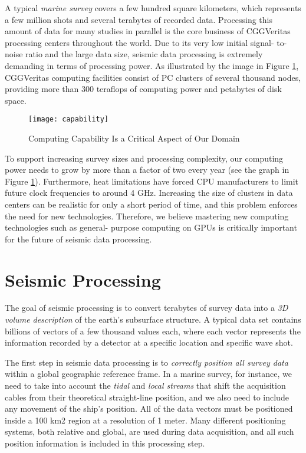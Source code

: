\documentclass[twocolumn]{article}
\begin{document}
A typical \emph{marine survey} covers a few hundred square kilometers, which represents a few million shots and several terabytes of recorded data. Processing this amount of data for many studies in parallel is the core business of CGGVeritas processing centers throughout the world. Due to its very low initial signal- to-noise ratio and the large data size, seismic data processing is extremely demanding in terms of processing power. As illustrated by the image in Figure \ref{capability}, CGGVeritas computing facilities consist of PC clusters of several thousand nodes, providing more than 300 teraflops of computing power and petabytes of disk space.

\begin{figure}[htb]
        \centering
        \texttt{[image: capability]}
        \caption{Computing Capability Is a Critical Aspect of Our Domain}
        \label{capability}
\end{figure}

To support increasing survey sizes and processing complexity, our computing power needs to grow by more than a factor of two every year (see the graph in Figure \ref{capability}). Furthermore, heat limitations have forced CPU manufacturers to limit future clock frequencies to around 4 GHz. Increasing the size of clusters in data centers can be realistic for only a short period of time, and this problem enforces the need for new technologies. Therefore, we believe mastering new computing technologies such as general- purpose computing on GPUs is critically important for the future of seismic data processing.


\section{Seismic Processing}
The goal of seismic processing is to convert terabytes of survey data into a \emph{3D volume description} of the earth's subsurface structure. A typical data set contains billions of vectors of a few thousand values each, where each vector represents the information recorded by a detector at a specific location and specific wave shot.

The first step in seismic data processing is to \emph{correctly position all survey data} within a global geographic reference frame. In a marine survey, for instance, we need to take into account the \emph{tidal} and \emph{local streams} that shift the acquisition cables from their theoretical straight-line position, and we also need to
include any movement of the ship's position. All of the data vectors must be positioned inside a 100 km2 region at a resolution of 1 meter. Many different positioning systems, both relative and global, are used during data acquisition, and all such position information is included in this processing step.
\end{document}
